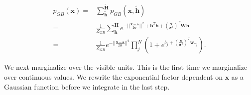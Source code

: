 \documentclass[%
oneside,                 %
final,                   %
10pt]{article}
\begin{document}
\begin{align}
	p_{GB} (\bm{x}) =& \sum_{\tilde{\bm{h}}}^{\tilde{\bm{H}}} p_{GB} (\bm{x}, \tilde{\bm{h}}) \nonumber \\
	=& \frac{1}{Z_{GB}} \sum_{\tilde{\bm{h}}}^{\tilde{\bm{H}}} 
	e^{-\vert\vert\frac{\bm{x} -\bm{a}}{2\bm{\sigma}}\vert\vert^2 + \bm{b}^T \tilde{\bm{h}} 
	+ (\frac{\bm{x}}{\bm{\sigma}^2})^T \bm{W}\tilde{\bm{h}}} \nonumber \\
	=& \frac{1}{Z_{GB}} e^{-\vert\vert\frac{\bm{x} -\bm{a}}{2\bm{\sigma}}\vert\vert^2}
	\prod_j^N (1 + e^{b_j + (\frac{\bm{x}}{\bm{\sigma}^2})^T \bm{w}_{\ast j}} ) .
\end{align}

We next marginalize over the visible units. This is the first time we
marginalize over continuous values. We rewrite the exponential factor
dependent on $\bm{x}$ as a Gaussian function before we integrate in
the last step.
\end{document}
